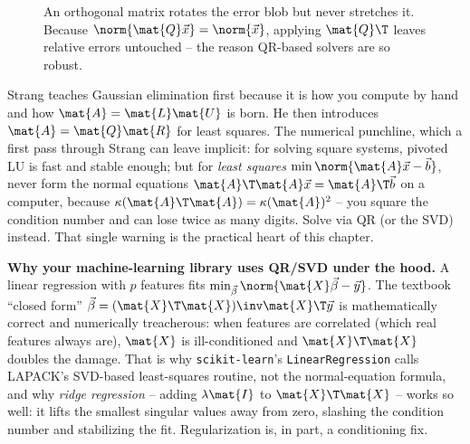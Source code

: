 \begin{figure}[H]
\centering
{}
\caption{An orthogonal matrix rotates the error blob but never stretches it. Because
$\norm{\mat{Q}\vec{x}}=\norm{\vec{x}}$, applying $\mat{Q}\T$ leaves relative errors
untouched -- the reason QR-based solvers are so robust.}
\label{ch33:orthogonal}
\end{figure}

\begin{strangbox}
Strang teaches Gaussian elimination first because it is how you compute by hand and how
$\mat{A}=\mat{L}\mat{U}$ is born. He then introduces $\mat{A}=\mat{Q}\mat{R}$ for
least squares. The numerical punchline, which a first pass through Strang can leave
implicit: for solving square systems, pivoted LU is fast and stable enough; but for
\emph{least squares} $\min\norm{\mat{A}\vec{x}-\vec{b}}$, never form the normal
equations $\mat{A}\T\mat{A}\vec{x}=\mat{A}\T\vec{b}$ on a computer, because
$\kappa(\mat{A}\T\mat{A}) = \kappa(\mat{A})^2$ -- you square the condition number and
can lose twice as many digits. Solve via QR (or the SVD) instead. That single warning
is the practical heart of this chapter.
\end{strangbox}

\begin{applicationbox}
\textbf{Why your machine-learning library uses QR/SVD under the hood.} A linear
regression with $p$ features fits $\min_{\vec\beta}\norm{\mat{X}\vec\beta - \vec{y}}$.
The textbook ``closed form'' $\vec\beta = (\mat{X}\T\mat{X})\inv\mat{X}\T\vec{y}$ is
mathematically correct and numerically treacherous: when features are correlated (which
real features always are), $\mat{X}$ is ill-conditioned and $\mat{X}\T\mat{X}$ doubles
the damage. That is why \texttt{scikit-learn}'s \texttt{LinearRegression} calls
LAPACK's SVD-based least-squares routine, not the normal-equation formula, and why
\emph{ridge regression} -- adding $\lambda\mat{I}$ to $\mat{X}\T\mat{X}$ -- works so
well: it lifts the smallest singular values away from zero, slashing the condition
number and stabilizing the fit. Regularization is, in part, a conditioning fix.
\end{applicationbox}

